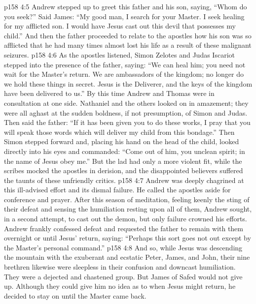 \vs p158 4:5 Andrew stepped up to greet this father and his son, saying, “Whom do you seek?” Said James: “My good man, I search for your Master. I seek healing for my afflicted son. I would have Jesus cast out this devil that possesses my child.” And then the father proceeded to relate to the apostles how his son was so afflicted that he had many times almost lost his life as a result of these malignant seizures.
\vs p158 4:6 As the apostles listened, Simon Zelotes and Judas Iscariot stepped into the presence of the father, saying: “We can heal him; you need not wait for the Master’s return. We are ambassadors of the kingdom; no longer do we hold these things in secret. Jesus is the Deliverer, and the keys of the kingdom have been delivered to us.” By this time Andrew and Thomas were in consultation at one side. Nathaniel and the others looked on in amazement; they were all aghast at the sudden boldness, if not presumption, of Simon and Judas. Then said the father: “If it has been given you to do these works, I pray that you will speak those words which will deliver my child from this bondage.” Then Simon stepped forward and, placing his hand on the head of the child, looked directly into his eyes and commanded: “Come out of him, you unclean spirit; in the name of Jesus obey me.” But the lad had only a more violent fit, while the scribes mocked the apostles in derision, and the disappointed believers suffered the taunts of these unfriendly critics.
\vs p158 4:7 Andrew was deeply chagrined at this ill\hyp{}advised effort and its dismal failure. He called the apostles aside for conference and prayer. After this season of meditation, feeling keenly the sting of their defeat and sensing the humiliation resting upon all of them, Andrew sought, in a second attempt, to cast out the demon, but only failure crowned his efforts. Andrew frankly confessed defeat and requested the father to remain with them overnight or until Jesus’ return, saying: “Perhaps this sort goes not out except by the Master’s personal command.”
\vs p158 4:8 And so, while Jesus was descending the mountain with the exuberant and ecstatic Peter, James, and John, their nine brethren likewise were sleepless in their confusion and downcast humiliation. They were a dejected and chastened group. But James of Safed would not give up. Although they could give him no idea as to when Jesus might return, he decided to stay on until the Master came back.\plusone
{}
